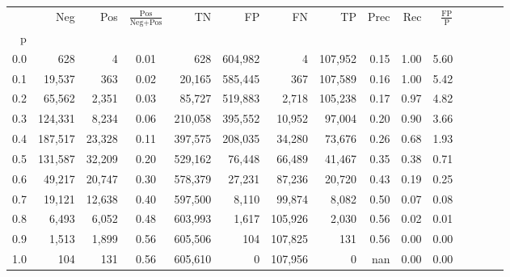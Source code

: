 \begin{tabular}{rrrcrrrrrrrrrrr}
\toprule
{} &      Neg &     Pos & $\frac{\text{Pos}}{\text{Neg}+\text{Pos}}$ &       TN &       FP &       FN &       TP &  Prec &   Rec & $\frac{\text{FP}}{\text{P}}$ \\
p   &          &         &                                            &          &          &          &          &       &       &                              \\
\midrule
0.0 &      628 &       4 &                                       0.01 &      628 &  604,982 &        4 &  107,952 &  0.15 &  1.00 &                         5.60 \\
0.1 &   19,537 &     363 &                                       0.02 &   20,165 &  585,445 &      367 &  107,589 &  0.16 &  1.00 &                         5.42 \\
0.2 &   65,562 &   2,351 &                                       0.03 &   85,727 &  519,883 &    2,718 &  105,238 &  0.17 &  0.97 &                         4.82 \\
0.3 &  124,331 &   8,234 &                                       0.06 &  210,058 &  395,552 &   10,952 &   97,004 &  0.20 &  0.90 &                         3.66 \\
0.4 &  187,517 &  23,328 &                                       0.11 &  397,575 &  208,035 &   34,280 &   73,676 &  0.26 &  0.68 &                         1.93 \\
0.5 &  131,587 &  32,209 &                                       0.20 &  529,162 &   76,448 &   66,489 &   41,467 &  0.35 &  0.38 &                         0.71 \\
0.6 &   49,217 &  20,747 &                                       0.30 &  578,379 &   27,231 &   87,236 &   20,720 &  0.43 &  0.19 &                         0.25 \\
0.7 &   19,121 &  12,638 &                                       0.40 &  597,500 &    8,110 &   99,874 &    8,082 &  0.50 &  0.07 &                         0.08 \\
0.8 &    6,493 &   6,052 &                                       0.48 &  603,993 &    1,617 &  105,926 &    2,030 &  0.56 &  0.02 &                         0.01 \\
0.9 &    1,513 &   1,899 &                                       0.56 &  605,506 &      104 &  107,825 &      131 &  0.56 &  0.00 &                         0.00 \\
1.0 &      104 &     131 &                                       0.56 &  605,610 &        0 &  107,956 &        0 &   nan &  0.00 &                         0.00 \\
\bottomrule
\end{tabular}
